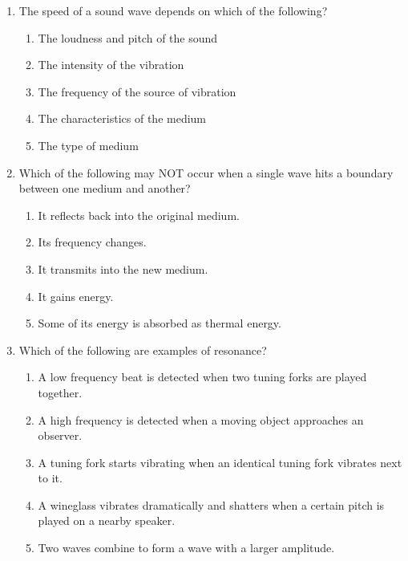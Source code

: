 \documentclass{../../../oss-apphys}
\begin{document}
\begin{multicols}{2}
\begin{enumerate}[leftmargin=18pt,resume]
  \item The speed of a sound wave depends on which of the following?
    \begin{enumerate}[noitemsep,topsep=0pt,leftmargin=18pt,label=(\Alph*)]
    \item The loudness and pitch of the sound
    \item The intensity of the vibration
    \item The frequency of the source of vibration
    \item The characteristics of the medium
    \item The type of medium
    \end{enumerate}
    

  \item Which of the following may NOT occur when a single wave hits a boundary
    between one medium and another?
    \begin{enumerate}[noitemsep,topsep=0pt,leftmargin=18pt,label=(\Alph*)]
    \item It reflects back into the original medium.
    \item Its frequency changes.
    \item It transmits into the new medium.
    \item It gains energy.
    \item Some of its energy is absorbed as thermal energy.
    \end{enumerate}

  \item Which of the following are examples of resonance?
    \label{multi-last}
    \begin{enumerate}[noitemsep,topsep=0pt,leftmargin=18pt,label=(\Alph*)]
    \item A low frequency beat is detected when two tuning forks are played
      together.
    \item A high frequency is detected when a moving object approaches an
      observer.
    \item A tuning fork starts vibrating when an identical tuning fork vibrates
      next to it.
    \item A wineglass vibrates dramatically and shatters when a certain pitch
      is played on a nearby speaker.
    \item Two waves combine to form a wave with a larger amplitude.
    \end{enumerate}
  \end{enumerate}
\end{multicols}
\newpage
\end{document}
